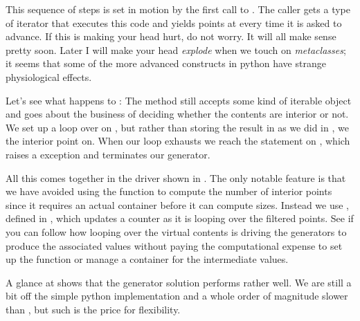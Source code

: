 This sequence of steps is set in motion by the first call to . The caller gets a
type of iterator that executes this code and yields points at 
every time it is asked to advance.  If this is making your head hurt, do not worry. It will all
make sense pretty soon. Later I will make your head {\em explode} when we touch on {\em
  metaclasses}; it seems that some of the more advanced constructs in python have strange
physiological effects\supercite{guido-metaclasses}.

Let's see what happens to :
%
%
The method  still accepts some kind of iterable object  and
goes about the business of deciding whether the contents are interior or not. We set up a loop
over  on , but rather than storing the
result in  as we did in , we 
the interior point on.  When our loop exhausts
 we reach the  statement on
, which raises a  exception and
terminates our generator.

All this comes together in the driver shown in . The only notable
feature is that we have avoided using the function  to compute the number of
interior points since it requires an actual container before it can compute sizes. Instead we
use , defined in , which updates a counter
as it is looping over the filtered points. See if you can follow how looping over the virtual
contents is driving the generators to produce the associated values without paying the
computational expense to set up the function or manage a container for the intermediate values.
%

A glance at  shows that the generator solution performs rather well. We
are still a bit off the simple python implementation and a whole order of magnitude slower than
\cpp, but such is the price for flexibility.

